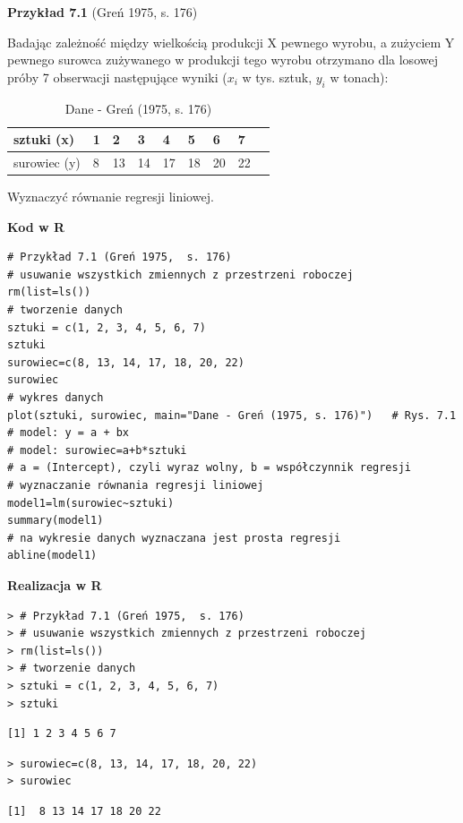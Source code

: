 \documentclass[12pt,B5paper,]{book}
\begin{document}
\textbf{Przykład 7.1} (Greń 1975, s. 176)

Badając zależność między wielkością produkcji X pewnego wyrobu, a
zużyciem Y pewnego surowca zużywanego w produkcji tego wyrobu otrzymano
dla losowej próby 7 obserwacji następujące wyniki (\(x_i\) w tys. sztuk,
\(y_i\) w tonach):

\begin{table}[H]
\centering
\caption{Dane - Greń (1975, s. 176)}
\label{gren}
\begin{tabular}{lllllllll}
sztuki (x) & 1 & 2  & 3  & 4  & 5  & 6  & 7  \\ \hline
surowiec (y) & 8 & 13 & 14 & 17 & 18 & 20 & 22
\end{tabular}
\end{table}

Wyznaczyć równanie regresji liniowej.

\vspace{0.4cm} \textbf{Kod w R}

\begin{verbatim}
# Przykład 7.1 (Greń 1975,  s. 176)
# usuwanie wszystkich zmiennych z przestrzeni roboczej
rm(list=ls()) 
# tworzenie danych
sztuki = c(1, 2, 3, 4, 5, 6, 7)
sztuki
surowiec=c(8, 13, 14, 17, 18, 20, 22)
surowiec
# wykres danych
plot(sztuki, surowiec, main="Dane - Greń (1975, s. 176)")   # Rys. 7.1
# model: y = a + bx
# model: surowiec=a+b*sztuki
# a = (Intercept), czyli wyraz wolny, b = współczynnik regresji
# wyznaczanie równania regresji liniowej
model1=lm(surowiec~sztuki)
summary(model1)
# na wykresie danych wyznaczana jest prosta regresji
abline(model1)
\end{verbatim}

\vspace{0.8cm} \textbf{Realizacja w R}

\begin{verbatim}
> # Przykład 7.1 (Greń 1975,  s. 176)
> # usuwanie wszystkich zmiennych z przestrzeni roboczej
> rm(list=ls()) 
> # tworzenie danych
> sztuki = c(1, 2, 3, 4, 5, 6, 7)
> sztuki
\end{verbatim}

\begin{verbatim}
[1] 1 2 3 4 5 6 7
\end{verbatim}

\begin{verbatim}
> surowiec=c(8, 13, 14, 17, 18, 20, 22)
> surowiec
\end{verbatim}

\begin{verbatim}
[1]  8 13 14 17 18 20 22
\end{verbatim}
\end{document}
